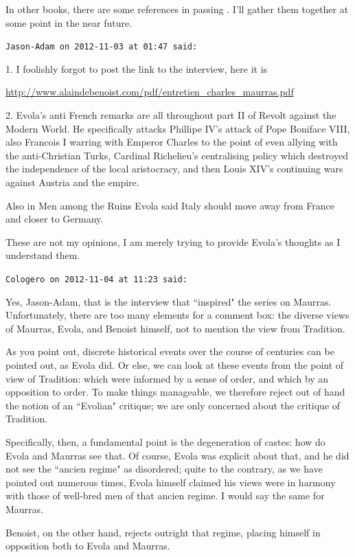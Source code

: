 \begin{footnotesize}
\begin{sffamily}
In other books, there are some references in passing . I'll gather them together at some point in the near future.


\hfill

\texttt{Jason-Adam on 2012-11-03 at 01:47 said: }

1. I foolishly forgot to post the link to the interview, here it is

\url{http://www.alaindebenoist.com/pdf/entretien\_charles\_maurras.pdf}

2. Evola's anti French remarks are all throughout part II of Revolt against the Modern World. He specifically attacks Phillipe IV's attack of Pope Boniface VIII, also Francois I warring with Emperor Charles to the point of even allying with the anti-Christian Turks, Cardinal Richelieu's centralising policy which destroyed the independence of the local aristocracy, and then Louis XIV's continuing wars against Austria and the empire.

Also in Men among the Ruins Evola said Italy should move away from France and closer to Germany.

These are not my opinions, I am merely trying to provide Evola's thoughts as I understand them.


\hfill

\texttt{Cologero on 2012-11-04 at 11:23 said: }

Yes, Jason-Adam, that is the interview that ``inspired" the series on Maurras. Unfortunately, there are too many elements for a comment box: the diverse views of Maurras, Evola, and Benoist himself, not to mention the view from Tradition.

As you point out, discrete historical events over the course of centuries can be pointed out, as Evola did. Or else, we can look at these events from the point of view of Tradition: which were informed by a sense of order, and which by an opposition to order. To make things manageable, we therefore reject out of hand the notion of an ``Evolian" critique; we are only concerned about the critique of Tradition.

Specifically, then, a fundamental point is the degeneration of castes: how do Evola and Maurras see that. Of course, Evola was explicit about that, and he did not see the ``ancien regime" as disordered; quite to the contrary, as we have pointed out numerous times, Evola himself claimed his views were in harmony with those of well-bred men of that ancien regime. I would say the same for Maurras.

Benoist, on the other hand, rejects outright that regime, placing himself in opposition both to Evola and Maurras.


\end{sffamily}
\end{footnotesize}
